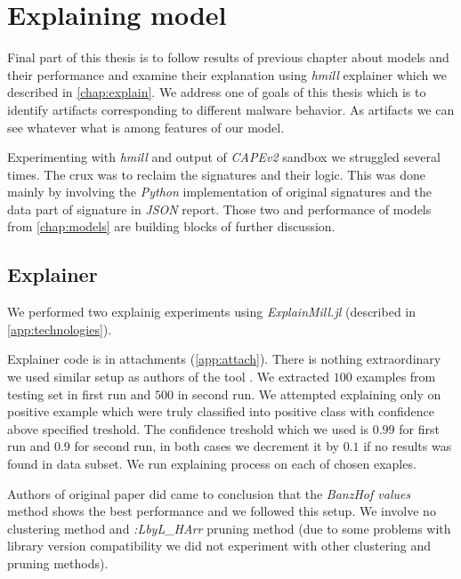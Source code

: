 \chapter{Explaining model} \label{chap:expex}
Final part of this thesis is to follow results of previous chapter about models and their performance and examine their explanation using \emph{hmill} explainer \cite{Pevny2020} which we described in \ref{chap:explain}. We address one of goals of this thesis which is to identify artifacts corresponding to different malware behavior. As artifacts we can see whatever what is among features of our model.

Experimenting with \emph{hmill} and output of \emph{CAPEv2} sandbox we struggled several times. The crux was to reclaim the signatures and their logic. This was done mainly by involving the \emph{Python} implementation of original signatures and the data part of signature in \emph{JSON} report. Those two and performance of models from \ref{chap:models} are building blocks of further discussion.


\section{Explainer}
We performed two explainig experiments using \emph{ExplainMill.jl} (described in \ref{app:technologies}). 

Explainer code is in attachments (\ref{app:attach}). There is nothing extraordinary we used similar setup as authors of the tool \cite{Pevny2020}. We extracted $100$ examples from testing set in first run and $500$ in second run. We attempted explaining only on positive example which were truly classified into positive class with confidence above specified treshold. The confidence treshold which we used is $0.99$ for first run and $0.9$ for second run, in both cases we decrement it by $0.1$ if no results was found in data subset. We run explaining process on each of chosen exaples.

Authors of original paper did came to conclusion that the \emph{BanzHof values} method shows the best performance and we followed this setup. We involve no clustering method and \emph{:LbyL_HArr}  pruning method (due to some problems with library version compatibility we did not experiment with other clustering and pruning methods).

